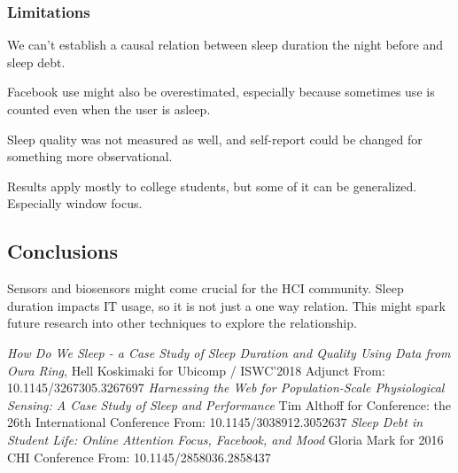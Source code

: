 \documentclass{IEEEtran}
\begin{document}
      \subsubsection{Limitations}
        We can't establish a causal relation between sleep duration the night before and sleep debt. \par 
        Facebook use might also be overestimated, especially because sometimes use is counted even when the user is asleep. \par 
        Sleep quality was not measured as well, and self-report could be changed for something more observational. \par 
        Results apply mostly to college students, but some of it can be generalized. Especially window focus.
    \subsection{Conclusions}
      Sensors and biosensors might come crucial for the HCI community. Sleep duration impacts IT usage, so it is not just a one way relation. This might spark future research into other techniques to explore the relationship.
  \begin{thebibliography}{}
      \textit{How Do We Sleep - a Case Study of Sleep Duration and Quality Using Data from Oura Ring},
      Hell Koskimaki for Ubicomp / ISWC'2018 Adjunct
      From: 10.1145/3267305.3267697
      \textit{Harnessing the Web for Population-Scale Physiological Sensing: A Case Study of Sleep and Performance}
      Tim Althoff for Conference: the 26th International Conference
      From: 10.1145/3038912.3052637
      \textit{Sleep Debt in Student Life: Online Attention Focus, Facebook, and Mood}
      Gloria Mark for 2016 CHI Conference
      From: 10.1145/2858036.2858437
  \end{thebibliography}
\end{document}
